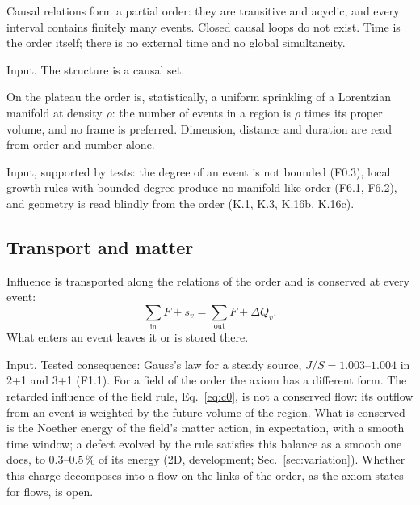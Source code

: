 \begin{axiom}\label{ax:order}
Causal relations form a partial order: they are transitive and acyclic, and every interval contains
finitely many events. Closed causal loops do not exist. Time is the order itself; there is no
external time and no global simultaneity.
\end{axiom}
\begin{status} Input. The structure is a causal set. \end{status}

\begin{axiom}\label{ax:substrate}
On the plateau the order is, statistically, a uniform sprinkling of a Lorentzian manifold at density
$\rho$: the number of events in a region is $\rho$ times its proper volume, and no frame is
preferred. Dimension, distance and duration are read from order and number alone.
\end{axiom}
\begin{status} Input, supported by tests: the degree of an event is not bounded (F0.3), local
growth rules with bounded degree produce no manifold-like order (F6.1, F6.2), and geometry is read
blindly from the order (K.1, K.3, K.16b, K.16c). \end{status}

\subsection{Transport and matter}

\begin{axiom}\label{ax:continuity}
Influence is transported along the relations of the order and is conserved at every event:
\begin{equation}
  \sum_{\text{in}}F+s_v=\sum_{\text{out}}F+\Delta Q_v .
\end{equation}
What enters an event leaves it or is stored there.
\end{axiom}
\begin{status} Input. Tested consequence: Gauss's law for a steady source, $J/S=1.003$--$1.004$ in
2+1 and 3+1 (F1.1). For a field of the order the axiom has a different form. The retarded influence of the field
rule, Eq.~\eqref{eq:c0}, is not a conserved flow: its outflow from an event is weighted by the future volume of the
region. What is conserved is the Noether energy of the field's matter action, in expectation, with a smooth time
window; a defect evolved by the rule satisfies this balance as a smooth one does, to $0.3$--$0.5\,\%$ of its
energy (2D, development; Sec.~\ref{sec:variation}). Whether this charge decomposes into a flow on the links of the
order, as the axiom states for flows, is open. \end{status}

